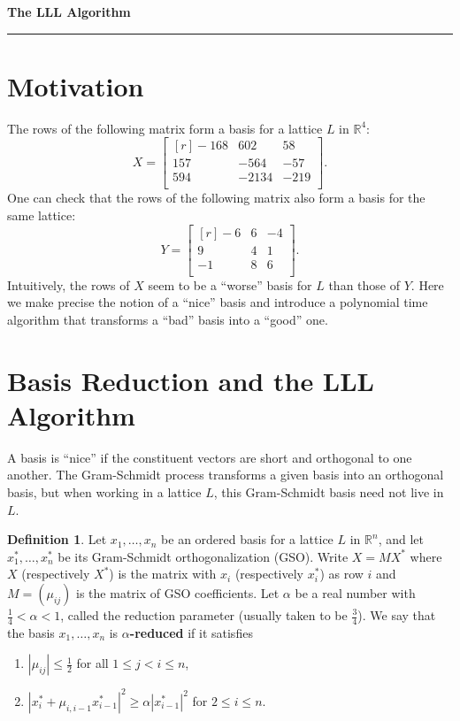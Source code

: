 \documentclass[11pt,letterpaper]{article}
\newcommand{\reals}{\mathbb{R}}
\theoremstyle{definition}
\newtheorem{definition}{Definition}[section]
\begin{document}
\begin{center}
{\bf \Large The LLL Algorithm} %
\vspace{0.2cm}
\hrule
\end{center}
%	
\section{Motivation}
The rows of the following matrix form a basis for a lattice $L$ in $\reals^4$:
\[
X = \begin{bmatrix*}[r]
	-168 & 602 & 58\\
	157 & -564 & -57\\
	594 & -2134 & -219\\
\end{bmatrix*}.
\]
One can check that the rows of the following matrix also form a basis for the same lattice:
\[
Y = \begin{bmatrix*}[r]
	-6 & 6 & -4\\
	9 & 4 & 1\\
	-1 & 8 & 6\\
\end{bmatrix*}.
\]
Intuitively, the rows of $X$ seem to be a ``worse'' basis for $L$ than those of $Y$. Here we make precise the notion of a ``nice'' basis and introduce a polynomial time algorithm that transforms a ``bad'' basis into a ``good'' one. 

\section{Basis Reduction and the LLL Algorithm}
A basis is ``nice'' if the constituent vectors are short and orthogonal to one another. The Gram-Schmidt process transforms a given basis into an orthogonal basis, but when working in a lattice $L$, this Gram-Schmidt basis need not live in $L$.
\begin{definition}
	Let $x_1, \ldots, x_n$ be an ordered basis for a lattice $L$ in $\reals^n$, and let $x_1^*, \ldots, x_n^*$ be its Gram-Schmidt orthogonalization (GSO). Write $X = MX^*$ where $X$ (respectively $X^*$) is the matrix with $x_i$ (respectively $x_i^*$) as row $i$ and $M = (\mu_{ij})$ is the matrix of GSO coefficients. Let $\alpha$ be a real number with $\frac{1}{4}<\alpha<1$, called the reduction parameter (usually taken to be $\frac{3}{4}$). We say that the basis $x_1, \ldots, x_n$ is \textbf{$\alpha$-reduced} if it satisfies
	\begin{enumerate}
		\item $|\mu_{ij}|\leq \frac{1}{2}$ for all $1\leq j<i\leq n$,
		\item $|x_i^* + \mu_{i, i-1}x_{i-1}^*|^2 \geq \alpha|x_{i-1}^*|^2$ for $2\leq i\leq n$.
	\end{enumerate}
\end{definition}
\end{document}
